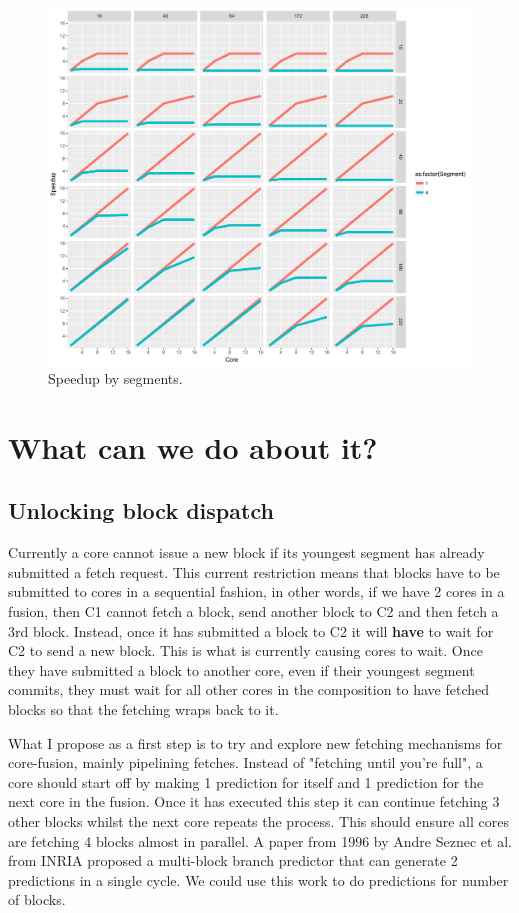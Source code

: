 \begin{figure}
\center
  \includegraphics[width=1\textwidth]{chapter3/graphics/size_vs_length.pdf}
  \caption{Speedup by segments.}\label{fig:svl}
\end{figure}

\newpage
\section{What can we do about it?}

\subsection{Unlocking block dispatch}

Currently a core cannot issue a new block if its youngest segment has already submitted a fetch request.
This current restriction means that blocks have to be submitted to cores in a sequential fashion, in other words, if we have 2 cores in a fusion, then C1 cannot fetch a block, send another block to C2 and then fetch a 3rd block. Instead, once it has submitted a block to C2 it will \textbf{have} to wait for C2 to send a new block.
This is what is currently causing cores to wait. Once they have submitted a block to another core, even if their youngest segment commits, they must wait for all other cores in the composition to have fetched blocks so that the fetching wraps back to it.

What I propose as a first step is to try and explore new fetching mechanisms for core-fusion, mainly pipelining fetches.
Instead of "fetching until you're full", a core should start off by making 1 prediction for itself and 1 prediction for the next core in the fusion.
Once it has executed this step it can continue fetching 3 other blocks whilst the next core repeats the process.
This should ensure all cores are fetching 4 blocks almost in parallel.
A paper from 1996 by Andre Seznec et al. from INRIA proposed a multi-block branch predictor that can generate 2 predictions in a single cycle.
We could use this work to do predictions for number of blocks.

